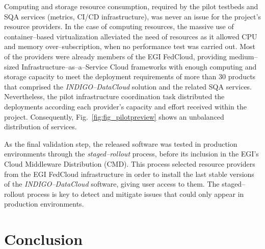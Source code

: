 Computing and storage resource consumption, required by the pilot testbeds and SQA services
(metrics, CI/CD infrastructure), was never an issue for the project's resource providers.
In the case of computing resources, the massive use of container--based virtualization 
alleviated the need of resources as it allowed CPU and memory over--subscription, when no
performance test was carried out. Most of the providers were already members of the EGI 
FedCloud, providing medium--sized Infrastructure--as--a--Service Cloud frameworks with 
enough computing and storage capacity to meet the deployment requirements of more than 30 
products that comprised the {\sl INDIGO--DataCloud} solution and the related SQA services.
Nevertheless, the pilot infrastructure coordination task distributed the deployments
according each provider's capacity and effort received within the project. Consequently,
Fig.~\ref{fig:fig_pilotpreview} shows an unbalanced distribution of services.

As the final validation step, the released software was tested in production environments
through the \emph{staged--rollout} process, before its inclusion in the EGI's Cloud 
Middleware Distribution (CMD). This process selected resource providers from the EGI FedCloud
infrastructure in order to install the last stable versions of the {\sl INDIGO--DataCloud}
software, giving user access to them. The staged--rollout process is key to detect and 
mitigate issues that could only appear in production environments.

\section{Conclusion}
\label{sec:con}


